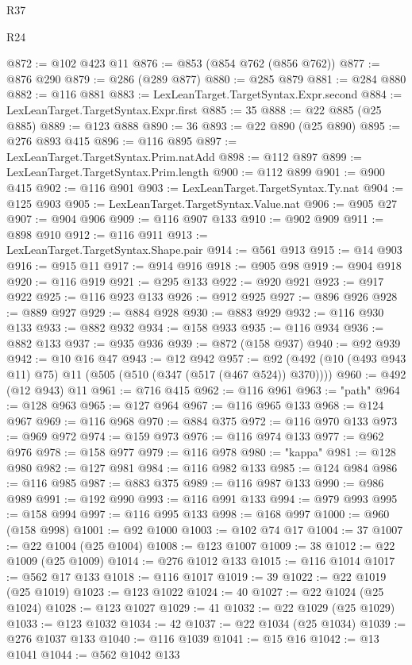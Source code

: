 \begin{lexlean}{R37}
\begin{lexlean}{R24}
\begin{coremodule}
{{{{{{{{{{{{{{{{{{{{{{{{{{{{{{{{{{{{{{{{{{{{{{{{{{{{{{{{{{{{{{{{{{{{{{{{{{{{{{{{{{{{{{{{{{{{{{{{{{{{{{{{{{{{{{{{{{{{{{{{{{{{{{{{{{{{{{{{{{{{{{{{{{{{{{{{{{{{{{{{{{{{{{{{{{{{{{{{{{{{{{{{{@872 := @102 @423 @11
@876 := @853 (@854 @762 (@856 @762))
@877 := @876 @290
@879 := @286 (@289 @877)
@880 := @285 @879
@881 := @284 @880
@882 := @116 @881
@883 := LexLeanTarget.TargetSyntax.Expr.second
@884 := LexLeanTarget.TargetSyntax.Expr.first
@885 := 35
@888 := @22 @885 (@25 @885)
@889 := @123 @888
@890 := 36
@893 := @22 @890 (@25 @890)
@895 := @276 @893 @415
@896 := @116 @895
@897 := LexLeanTarget.TargetSyntax.Prim.natAdd
@898 := @112 @897
@899 := LexLeanTarget.TargetSyntax.Prim.length
@900 := @112 @899
@901 := @900 @415
@902 := @116 @901
@903 := LexLeanTarget.TargetSyntax.Ty.nat
@904 := @125 @903
@905 := LexLeanTarget.TargetSyntax.Value.nat
@906 := @905 @27
@907 := @904 @906
@909 := @116 @907 @133
@910 := @902 @909
@911 := @898 @910
@912 := @116 @911
@913 := LexLeanTarget.TargetSyntax.Shape.pair
@914 := @561 @913
@915 := @14 @903
@916 := @915 @11
@917 := @914 @916
@918 := @905 @98
@919 := @904 @918
@920 := @116 @919
@921 := @295 @133
@922 := @920 @921
@923 := @917 @922
@925 := @116 @923 @133
@926 := @912 @925
@927 := @896 @926
@928 := @889 @927
@929 := @884 @928
@930 := @883 @929
@932 := @116 @930 @133
@933 := @882 @932
@934 := @158 @933
@935 := @116 @934
@936 := @882 @133
@937 := @935 @936
@939 := @872 (@158 @937)
@940 := @92 @939
@942 := @10 @16 @47
@943 := @12 @942
@957 := @92 (@492 (@10 (@493 @943 @11) @75) @11 (@505 (@510 (@347 (@517 (@467 @524)) @370))))
@960 := @492 (@12 @943) @11
@961 := @716 @415
@962 := @116 @961
@963 := "path"
@964 := @128 @963
@965 := @127 @964
@967 := @116 @965 @133
@968 := @124 @967
@969 := @116 @968
@970 := @884 @375
@972 := @116 @970 @133
@973 := @969 @972
@974 := @159 @973
@976 := @116 @974 @133
@977 := @962 @976
@978 := @158 @977
@979 := @116 @978
@980 := "kappa"
@981 := @128 @980
@982 := @127 @981
@984 := @116 @982 @133
@985 := @124 @984
@986 := @116 @985
@987 := @883 @375
@989 := @116 @987 @133
@990 := @986 @989
@991 := @192 @990
@993 := @116 @991 @133
@994 := @979 @993
@995 := @158 @994
@997 := @116 @995 @133
@998 := @168 @997
@1000 := @960 (@158 @998)
@1001 := @92 @1000
@1003 := @102 @74 @17
@1004 := 37
@1007 := @22 @1004 (@25 @1004)
@1008 := @123 @1007
@1009 := 38
@1012 := @22 @1009 (@25 @1009)
@1014 := @276 @1012 @133
@1015 := @116 @1014
@1017 := @562 @17 @133
@1018 := @116 @1017
@1019 := 39
@1022 := @22 @1019 (@25 @1019)
@1023 := @123 @1022
@1024 := 40
@1027 := @22 @1024 (@25 @1024)
@1028 := @123 @1027
@1029 := 41
@1032 := @22 @1029 (@25 @1029)
@1033 := @123 @1032
@1034 := 42
@1037 := @22 @1034 (@25 @1034)
@1039 := @276 @1037 @133
@1040 := @116 @1039
@1041 := @15 @16
@1042 := @13 @1041
@1044 := @562 @1042 @133
}}}}}}}}}}}}}}}}}}}}}}}}}}}}}}}}}}}}}}}}}}}}}}}}}}}}}}}}}}}}}}}}}}}}}}}}}}}}}}}}}}}}}}}}}}}}}}}}}}}}}}}}}}}}}}}}}}}}}}}}}}}}}}}}}}}}}}}}}}}}}}}}}}}}}}}}}}}}}}}}}}}}}}}}}}}}}}}}}}}}}}}}}
\end{coremodule}
\end{lexlean}
\end{lexlean}
